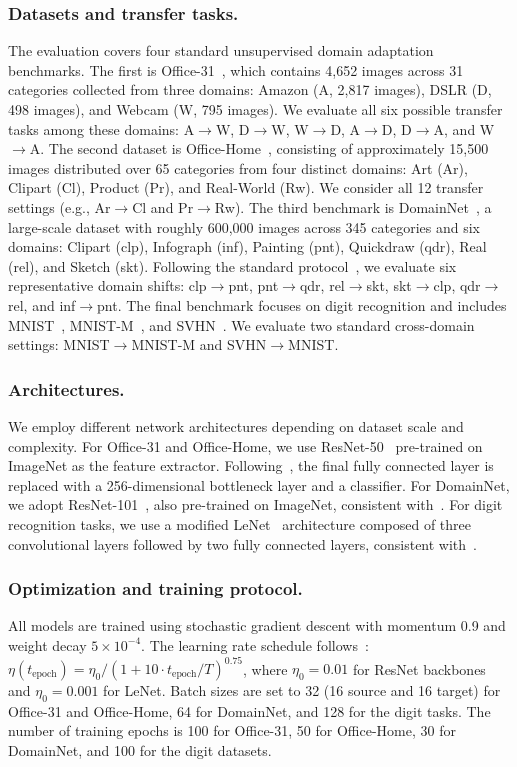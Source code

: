 \documentclass[pdflatex,sn-mathphys-num]{sn-jnl}
\theoremstyle{thmstyleone}
\theoremstyle{thmstyletwo}
\theoremstyle{thmstylethree}
\begin{document}
\subsubsection{Datasets and transfer tasks.}
The evaluation covers four standard unsupervised domain adaptation benchmarks.
The first is Office-31~\cite{saenko2010office}, which contains 4,652 images across 31 categories collected from three domains: Amazon (A, 2,817 images), DSLR (D, 498 images), and Webcam (W, 795 images). We evaluate all six possible transfer tasks among these domains: A$\to$W, D$\to$W, W$\to$D, A$\to$D, D$\to$A, and W$\to$A.
The second dataset is Office-Home~\cite{venkateswara2017officehome}, consisting of approximately 15,500 images distributed over 65 categories from four distinct domains: Art (Ar), Clipart (Cl), Product (Pr), and Real-World (Rw). We consider all 12 transfer settings (e.g., Ar$\to$Cl and Pr$\to$Rw).
The third benchmark is DomainNet~\cite{peng2019moment}, a large-scale dataset with roughly 600,000 images across 345 categories and six domains: Clipart (clp), Infograph (inf), Painting (pnt), Quickdraw (qdr), Real (rel), and Sketch (skt). Following the standard protocol~\cite{peng2019moment}, we evaluate six representative domain shifts: clp$\to$pnt, pnt$\to$qdr, rel$\to$skt, skt$\to$clp, qdr$\to$rel, and inf$\to$pnt.
The final benchmark focuses on digit recognition and includes MNIST~\cite{lecun1998mnist}, MNIST-M~\cite{ganin2016dann}, and SVHN~\cite{netzer2011svhn}. We evaluate two standard cross-domain settings: MNIST$\to$MNIST-M and SVHN$\to$MNIST.

\subsubsection{Architectures.}
We employ different network architectures depending on dataset scale and complexity.
For Office-31 and Office-Home, we use ResNet-50~\cite{he2016resnet} pre-trained on ImageNet as the feature extractor. Following~\cite{long2018cdan}, the final fully connected layer is replaced with a 256-dimensional bottleneck layer and a classifier.
For DomainNet, we adopt ResNet-101~\cite{he2016resnet}, also pre-trained on ImageNet, consistent with~\cite{peng2019moment}.
For digit recognition tasks, we use a modified LeNet~\cite{lecun1998mnist} architecture composed of three convolutional layers followed by two fully connected layers, consistent with~\cite{ganin2016dann}.

\subsubsection{Optimization and training protocol.}
All models are trained using stochastic gradient descent with momentum 0.9 and weight decay $5 \times 10^{-4}$.
The learning rate schedule follows~\cite{ganin2016dann}:
$\eta(t_{\text{epoch}}) = \eta_0 / (1 + 10 \cdot t_{\text{epoch}} / T)^{0.75}$,
where $\eta_0 = 0.01$ for ResNet backbones and $\eta_0 = 0.001$ for LeNet.
Batch sizes are set to 32 (16 source and 16 target) for Office-31 and Office-Home, 64 for DomainNet, and 128 for the digit tasks.
The number of training epochs is 100 for Office-31, 50 for Office-Home, 30 for DomainNet, and 100 for the digit datasets.
\end{document}
